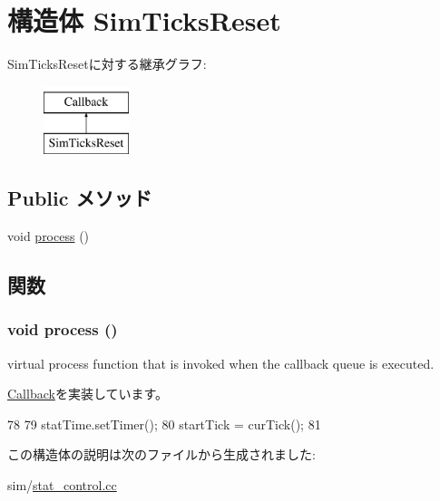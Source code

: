 \hypertarget{structStats_1_1SimTicksReset}{
\section{構造体 SimTicksReset}
\label{structStats_1_1SimTicksReset}
}
SimTicksResetに対する継承グラフ:\begin{figure}[H]
\begin{center}
\leavevmode
\includegraphics[height=2cm]{structStats_1_1SimTicksReset}
\end{center}
\end{figure}
\subsection*{Public メソッド}
\begin{DoxyCompactItemize}
\item 
void \hyperlink{structStats_1_1SimTicksReset_a2e9c5136d19b1a95fc427e0852deab5c}{process} ()
\end{DoxyCompactItemize}


\subsection{関数}
\hypertarget{structStats_1_1SimTicksReset_a2e9c5136d19b1a95fc427e0852deab5c}{
\subsubsection[{process}]{\setlength{\rightskip}{0pt plus 5cm}void process ()}}
\label{structStats_1_1SimTicksReset_a2e9c5136d19b1a95fc427e0852deab5c}
virtual process function that is invoked when the callback queue is executed. 

\hyperlink{classCallback_a142b75b68a6291400e20fb0dd905b1c8}{Callback}を実装しています。


\begin{DoxyCode}
78     {
79         statTime.setTimer();
80         startTick = curTick();
81     }
\end{DoxyCode}


この構造体の説明は次のファイルから生成されました:\begin{DoxyCompactItemize}
\item 
sim/\hyperlink{stat__control_8cc}{stat\_\-control.cc}\end{DoxyCompactItemize}
